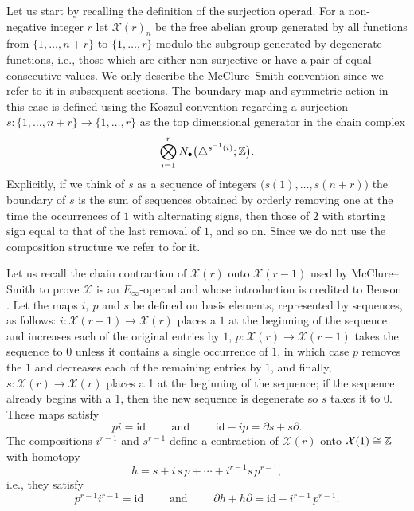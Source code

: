 Let us start by recalling the definition of the surjection operad.
For a non-negative integer $r$ let $\mathcal X(r)_n$ be the free abelian group generated by all functions from $\{1, \dots, n+r\}$ to $\{1, \dots, r\}$ modulo the subgroup generated by degenerate functions, i.e., those which are either non-surjective or have a pair of equal consecutive values.
We only describe the McClure--Smith convention since we refer to it in subsequent sections.
The boundary map and symmetric action in this case is defined using the Koszul convention regarding a surjection $s \colon \{1, \dots, n+r\} \to \{1, \dots, r\} $ as the top dimensional generator in the chain complex
\begin{equation} \label{eq: surjection boundary}
\bigotimes_{i = 1}^r N_\bullet \big( \triangle^{s^{-1}(i)}; \mathbb{Z} \big).
\end{equation}
Explicitly, if we think of $s$ as a sequence of integers $\big( s(1), \dots, s(n+r) \big)$ the boundary of $s$ is the sum of sequences obtained by orderly removing one at the time the occurrences of $1$ with alternating signs, then those of $2$ with starting sign equal to that of the last removal of $1$, and so on.
Since we do not use the composition structure we refer to \cite{mcclure03cochain} for it.

Let us recall the chain contraction of $\mathcal X(r)$ onto $\mathcal X(r-1)$ used by McClure--Smith to prove $\mathcal X$ is an $E_\infty$-operad and whose introduction is credited to Benson \cite{benson1998rep}.
Let the maps $i,\ p$ and $s$ be defined on basis elements, represented by sequences, as follows: $i \colon \mathcal X(r-1) \to \mathcal X(r)$ places a $1$ at the beginning of the sequence and increases each of the original entries by $1$, $p \colon \mathcal X(r) \to \mathcal X(r-1)$ takes the sequence to $0$ unless it contains a single occurrence of $1$, in which case $p$ removes the $1$ and decreases each of the remaining entries by $1$, and finally, $s \colon \mathcal X(r) \to \mathcal X(r)$ places a 1 at the beginning of the sequence; if the sequence already begins
with a 1, then the new sequence is degenerate so $s$ takes it to $0$.
These maps satisfy
\begin{equation*}
p i = \mathrm{id}
\qquad \text{ and } \qquad
\mathrm{id} - i p = \partial s + s \partial.
\end{equation*}
The compositions $i^{r-1}$ and $s^{r-1}$ define a contraction of $\mathcal X(r)$ onto $\mathcal X(1) \cong \mathbb{Z}$ with homotopy
\begin{equation*}
h = s + i\, s\, p + \cdots + i^{r-1} s\, p^{r-1},
\end{equation*}
i.e., they satisfy
\begin{equation*}
p^{r-1} i^{r-1} = \mathrm{id}
\qquad \text{ and } \qquad
\partial h + h \partial = \mathrm{id} - i^{r-1}\,p^{r-1}.
\end{equation*}

